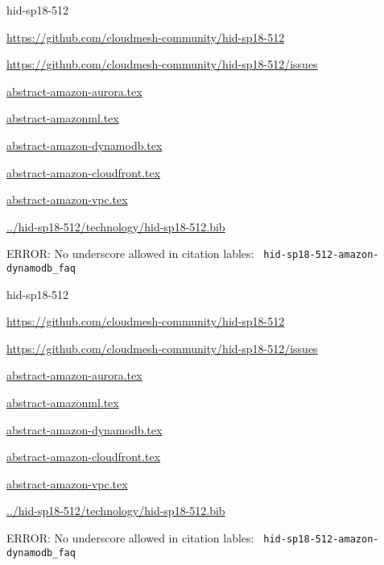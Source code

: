 \begin{IU}

hid-sp18-512

\url{https://github.com/cloudmesh-community/hid-sp18-512}

\url{https://github.com/cloudmesh-community/hid-sp18-512/issues}

\href{https://github.com/cloudmesh-community/hid-sp18-512/blob/master//technology/abstract-amazon-aurora.tex}{abstract-amazon-aurora.tex}

\href{https://github.com/cloudmesh-community/hid-sp18-512/blob/master//technology/abstract-amazonml.tex}{abstract-amazonml.tex}

\href{https://github.com/cloudmesh-community/hid-sp18-512/blob/master//technology/abstract-amazon-dynamodb.tex}{abstract-amazon-dynamodb.tex}

\href{https://github.com/cloudmesh-community/hid-sp18-512/blob/master//technology/abstract-amazon-cloudfront.tex}{abstract-amazon-cloudfront.tex}

\href{https://github.com/cloudmesh-community/hid-sp18-512/blob/master//technology/abstract-amazon-vpc.tex}{abstract-amazon-vpc.tex}

\href{https://github.com/cloudmesh-community/hid-sp18-512/blob/master//technology/hid-sp18-512.bib}{../hid-sp18-512/technology/hid-sp18-512.bib}

 ERROR: No underscore allowed in citation lables: \verb| hid-sp18-512-amazon-dynamodb_faq |

\end{IU}


\begin{IU}

hid-sp18-512

\url{https://github.com/cloudmesh-community/hid-sp18-512}

\url{https://github.com/cloudmesh-community/hid-sp18-512/issues}

\href{https://github.com/cloudmesh-community/hid-sp18-512/blob/master//technology/abstract-amazon-aurora.tex}{abstract-amazon-aurora.tex}

\href{https://github.com/cloudmesh-community/hid-sp18-512/blob/master//technology/abstract-amazonml.tex}{abstract-amazonml.tex}

\href{https://github.com/cloudmesh-community/hid-sp18-512/blob/master//technology/abstract-amazon-dynamodb.tex}{abstract-amazon-dynamodb.tex}

\href{https://github.com/cloudmesh-community/hid-sp18-512/blob/master//technology/abstract-amazon-cloudfront.tex}{abstract-amazon-cloudfront.tex}

\href{https://github.com/cloudmesh-community/hid-sp18-512/blob/master//technology/abstract-amazon-vpc.tex}{abstract-amazon-vpc.tex}

\href{https://github.com/cloudmesh-community/hid-sp18-512/blob/master//technology/hid-sp18-512.bib}{../hid-sp18-512/technology/hid-sp18-512.bib}

 ERROR: No underscore allowed in citation lables: \verb| hid-sp18-512-amazon-dynamodb_faq |

\end{IU}


